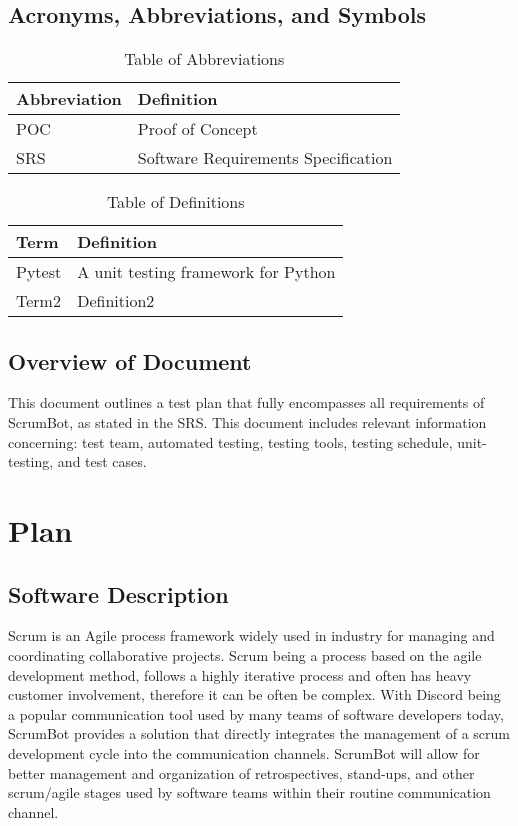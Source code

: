 \documentclass[12pt, titlepage]{article}
\begin{document}
\subsection{Acronyms, Abbreviations, and Symbols}
    
\begin{table}[hbp]
    \caption{Table of Abbreviations}
    \label{Table}
    \begin{tabularx}{\textwidth}{p{3cm}X}
        \toprule
        \textbf{Abbreviation} & \textbf{Definition} \\
        \midrule
        POC & Proof of Concept\\
        SRS & Software Requirements Specification\\
        \bottomrule
    \end{tabularx}
\end{table}

\begin{table}[!htbp]
    \caption{Table of Definitions}
    \label{Table}
    \begin{tabularx}{\textwidth}{p{3cm}X}
        \toprule
        \textbf{Term} & \textbf{Definition}\\
        \midrule
        Pytest & A unit testing framework for Python\\
        Term2 & Definition2\\
        \bottomrule
    \end{tabularx}
\end{table} 

\subsection{Overview of Document}
This document outlines a test plan that fully encompasses all requirements of ScrumBot, as stated in the SRS. This document includes relevant information concerning: test team, automated testing, testing tools, testing schedule, unit-testing, and test cases.

\section{Plan}
\subsection{Software Description}
Scrum is an Agile process framework widely used in industry for managing and coordinating collaborative projects. Scrum being a process based on the agile development method, follows a highly iterative process and often has heavy customer involvement, therefore it can be often be complex. With Discord being a popular communication tool used by many teams of software developers today, ScrumBot provides a solution that directly integrates the management of a scrum development cycle into the communication channels. ScrumBot will allow for better management and organization of retrospectives, stand-ups, and other scrum/agile stages used by software teams within their routine communication channel.
\end{document}
